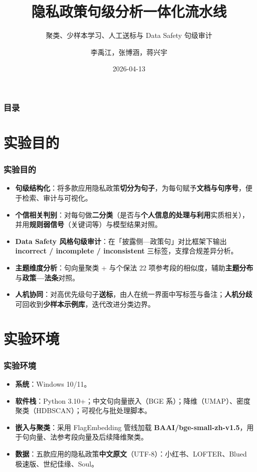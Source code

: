 \documentclass[AutoFakeBold,AutoFakeSlant]{beamer}
\author{李禹江，张博涵，蒋兴宇}
\title{隐私政策句级分析一体化流水线}
\subtitle{\texorpdfstring{聚类、少样本学习、人工送标与 Data Safety 句级审计}{实验方法汇报}}
\institute{我的刀盾队}
\date{2026-04-13}
\begin{document}
\kaishu

\begin{frame}
    \titlepage
    \vspace{0.5em}
\end{frame}

\begin{frame}
    \frametitle{目录}
    \tableofcontents
\end{frame}

\section{实验目的}

\begin{frame}
    \frametitle{实验目的}
    \begin{itemize}
        \item \textbf{句级结构化}：将多款应用隐私政策\textbf{切分为句子}，为每句赋予\textbf{文档与句序号}，便于检索、审计与可视化。
        \item \textbf{个信相关判别}：对每句做\textbf{二分类}（是否与\textbf{个人信息的处理与利用}实质相关），并用\textbf{规则弱信号}（关键词等）与模型结果对照。
        \item \textbf{Data Safety 风格句级审计}：在「披露侧—政策句」对比框架下输出 \textbf{incorrect / incomplete / inconsistent} 三标签，支撑合规差异分析。
        \item \textbf{主题维度分析}：句向量聚类 + 与个保法 22 项参考段的相似度，辅助\textbf{主题分布}与\textbf{政策—法条}对照。
        \item \textbf{人机协同}：对高优先级句子\textbf{送标}，由人在统一界面中写标签与备注；\textbf{人机分歧}可回收到\textbf{少样本示例库}，迭代改进分类边界。
    \end{itemize}
\end{frame}

\section{实验环境}

\begin{frame}
    \frametitle{实验环境}
    \begin{itemize}
        \item \textbf{系统}：Windows 10/11。
        \item \textbf{软件栈}：Python 3.10+；中文句向量嵌入（BGE 系）；降维（UMAP）、密度聚类（HDBSCAN）；可视化与批处理脚本。
        \item \textbf{嵌入与聚类}：采用 FlagEmbedding 管线加载 \textbf{BAAI/bge-small-zh-v1.5}，用于句向量、法参考段向量及后续降维聚类。
        \item \textbf{数据}：五款应用的隐私政策\textbf{中文原文}（UTF-8）：小红书、LOFTER、Blued 极速版、世纪佳缘、Soul。
    \end{itemize}
\end{frame}
\end{document}
